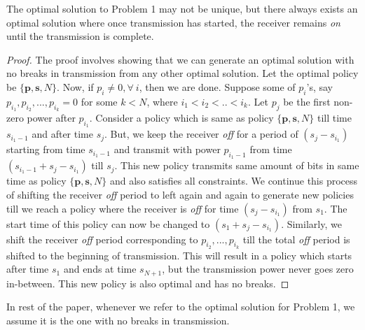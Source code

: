 \begin{lemma}
The optimal solution to Problem 1 may not be unique, but there always exists an optimal solution where once transmission has started, the receiver remains \textit{on} until the transmission is complete. \label{lemma_nobreaks}
\end{lemma}
\begin{proof}
The proof involves showing that we can generate an optimal solution with no breaks in transmission from any other optimal solution. Let the optimal policy be $\{\textbf{p},\textbf{s},N\}$. Now, if $p_i\neq 0,\forall \ i$, then we are done. Suppose some of $p_i$'s, say $p_{i_1},p_{i_2},...,p_{i_k}=0$ for some $k<N$, where $i_1<i_2<..<i_k$. Let $p_j$ be the first non-zero power after $p_{i_1}$. Consider a policy which is same as policy $\{\textbf{p},\textbf{s},N\}$ till time $s_{i_1-1}$ and after time $s_{j}$. But, we keep the receiver \textit{off} for a period of $(s_{j}-s_{i_1})$ starting from time $s_{i_1-1}$ and transmit with power $p_{i_1-1}$ from time $(s_{i_1-1}+s_{j}-s_{i_1})$ till $s_j$. This new policy transmits same amount of bits in same time  as policy $\{\textbf{p},\textbf{s},N\}$ and also satisfies all constraints. We continue this process of shifting the receiver \textit{off} period to left again and again to generate new policies till we reach a policy where the receiver is \textit{off} for time $(s_{j}-s_{i_1})$ from $s_1$. The start time of this policy can now be changed to $(s_1+s_{j}-s_{i_1})$. Similarly, we shift the receiver \textit{off} period corresponding to $p_{i_2},...,p_{i_k}$ till the total \textit{off} period is shifted to the beginning of transmission. This will result in a policy which starts after time $s_1$ and ends at time $s_{N+1}$, but the transmission power never goes zero in-between. This new policy is also optimal and has no breaks.
\end{proof}
In rest of the paper, whenever we refer to the optimal solution for Problem 1, we assume it is the one with no breaks in transmission.
